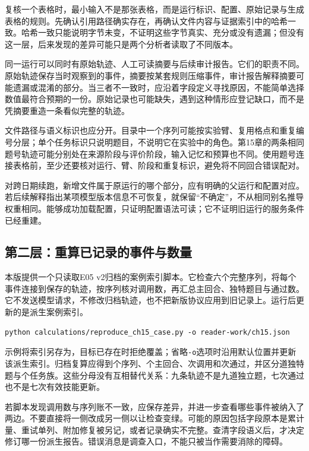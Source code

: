 复核一个表格时，最小输入不是那张表格，而是运行标识、配置、原始记录与生成表格的规则。先确认引用路径确实存在，再确认文件内容与证据索引中的哈希一致。哈希一致只能说明字节未变，不证明这些字节真实、充分或没有遗漏；但没有这一层，后来发现的差异可能只是两个分析者读取了不同版本。

同一运行可以同时有原始轨迹、人工可读摘要与后续审计报告。它们的职责不同。原始轨迹保存当时观察到的事件，摘要按某套规则压缩事件，审计报告解释摘要可能遗漏或混淆的部分。当三者不一致时，应沿着字段定义寻找原因，不能简单选择数值最符合预期的一份。原始记录也可能缺失，遇到这种情形应登记缺口，而不是凭摘要重造一条看似完整的轨迹。

文件路径与语义标识也应分开。目录中一个序列可能按实验臂、复用格点和重复编号分层；单个任务标识只说明题目，不说明它在实验中的角色。第15章的两条相同题号轨迹可能分别处在来源阶段与评价阶段，输入记忆和预算也不同。使用题号连接表格前，至少还要核对运行、臂、阶段和重复标识，避免将不同回合错误配对。

对跨日期续跑，新增文件属于原运行的哪个部分，应有明确的父运行和配置对应。若后续解释指出某项模型版本信息不可恢复，就保留“不确定”，不从相同别名推导权重相同。能够成功加载配置，只证明配置语法可读；它不证明旧运行的服务条件已经重建。

\subsection{第二层：重算已记录的事件与数量}

本版提供一个只读取E05 v2归档的案例索引脚本。它检查六个完整序列，将每个事件连接到保存的轨迹，按序列核对调用数，再汇总主回合、独特题目与通过数。它不发送模型请求，不修改归档轨迹，也不把新版协议应用到旧记录上。运行后更新的是派生案例索引。

\begin{verbatim}
python calculations/reproduce_ch15_case.py -o reader-work/ch15.json
\end{verbatim}

\begin{sloppypar}
示例将索引另存为，目标已存在时拒绝覆盖；省略\texttt{-o}选项时沿用默认位置并更新该派生索引。归档复算应得到个序列、个主回合、次调用和次通过，并区分道独特题与个任务族。这些分母没有互相替代关系：九条轨迹不是九道独立题，七次通过也不是七次有效技能更新。
\end{sloppypar}

若脚本发现调用数与序列账不一致，应保存差异，并进一步查看哪些事件被纳入了两边。不要直接将一侧改成另一侧以让检查变绿。可能的原因包括字段原本是累计量、重试单列、附加修复被另记，或者记录确实不完整。查清字段语义后，才决定修订哪一份派生报告。错误消息是调查入口，不能只被当作需要消除的障碍。

